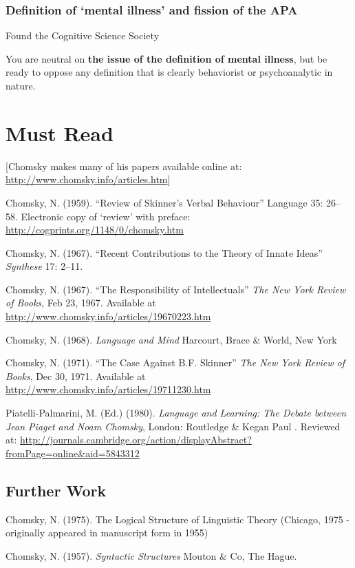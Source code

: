 \begin{refsection}
\subsubsection{Definition of ‘mental illness’ and fission of the APA}
\label{definitionof‘mentalillness’andfissionoftheapa}

Found the Cognitive Science Society

You are neutral on \textbf{the issue of the definition of mental illness}, but be ready to oppose any definition that is clearly behaviorist or psychoanalytic in nature.

\section{Must Read}
\label{mustread}

[Chomsky makes many of his papers available online at: \url{http://www.chomsky.info/articles.htm}]

Chomsky, N. (1959). ``Review of Skinner's Verbal Behaviour'' Language 35: 26--58. Electronic copy of ‘review’ with preface: \url{http://cogprints.org/1148/0/chomsky.htm}

Chomsky, N. (1967). ``Recent Contributions to the Theory of Innate Ideas'' \emph{Synthese} 17: 2--11.

Chomsky, N. (1967). “The Responsibility of Intellectuals” \emph{The New York Review of Books}, Feb 23, 1967. Available at \url{http://www.chomsky.info/articles/19670223.htm}

Chomsky, N. (1968). \emph{Language and Mind} Harcourt, Brace \& World, New York

Chomsky, N. (1971). “The Case Against B.F. Skinner” \emph{The New York Review of Books}, Dec 30, 1971. Available at \url{http://www.chomsky.info/articles/19711230.htm}

Piatelli-Palmarini, M. (Ed.) (1980). \emph{Language and Learning: The Debate between Jean Piaget and Noam Chomsky}, London: Routledge \& Kegan Paul . Reviewed at: \url{http://journals.cambridge.org/action/displayAbstract?fromPage=online&aid=5843312}

\subsection{Further Work}
\label{furtherwork}

Chomsky, N. (1975). The Logical Structure of Linguistic Theory (Chicago, 1975 - originally appeared in manuscript form in 1955)

Chomsky, N. (1957). \emph{Syntactic Structures} Mouton \& Co, The Hague.


\end{refsection}
